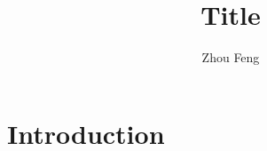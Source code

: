 \documentclass[a4paper,11pt]{amsart}
\title[small title]{Title}
\author{Zhou Feng}
\theoremstyle{plain}
\theoremstyle{definition}
\theoremstyle{remark}
\numberwithin{equation}{section} %
\begin{document}
\begin{abstract}

\end{abstract}
\maketitle

\section{Introduction}\label{sec:intro}





\label{sec:ref}

%
%
\end{document}
